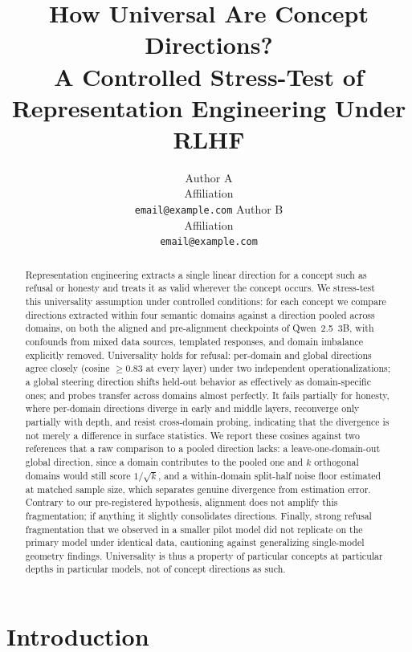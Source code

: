 \documentclass[11pt]{article}
\title{How Universal Are Concept Directions? \\ A Controlled Stress-Test of Representation Engineering Under RLHF}
\author{
  Author A \\
  Affiliation \\
  \texttt{email@example.com}
  \And
  Author B \\
  Affiliation \\
  \texttt{email@example.com}
}
\begin{document}
\maketitle

\begin{abstract}
Representation engineering extracts a single linear direction for a concept
such as refusal or honesty and treats it as valid wherever the concept
occurs. We stress-test this universality assumption under controlled
conditions: for each concept we compare directions extracted within four
semantic domains against a direction pooled across domains, on both the
aligned and pre-alignment checkpoints of Qwen~2.5~3B, with confounds from
mixed data sources, templated responses, and domain imbalance explicitly
removed. Universality holds for refusal: per-domain and global directions
agree closely (cosine $\geq 0.83$ at every layer) under two independent
operationalizations; a global steering direction shifts held-out
behavior as effectively as domain-specific ones; and probes transfer
across domains almost perfectly. It fails partially for honesty, where
per-domain directions diverge in early and middle layers, reconverge only
partially with depth, and resist cross-domain probing, indicating that the
divergence is not merely a difference in surface statistics. We report these
cosines against two references that a raw comparison to a pooled direction
lacks: a leave-one-domain-out global direction, since a domain contributes to
the pooled one and $k$ orthogonal domains would still score $1/\sqrt{k}$, and
a within-domain split-half noise floor estimated at matched sample size, which
separates genuine divergence from estimation error. Contrary to our pre-registered hypothesis, alignment does not
amplify this fragmentation; if anything it slightly consolidates directions.
Finally, strong refusal fragmentation that we observed in a smaller pilot
model did not replicate on the primary model under identical data,
cautioning against generalizing single-model geometry findings. Universality
is thus a property of particular concepts at particular depths in particular
models, not of concept directions as such.
\end{abstract}

\section{Introduction}
\label{sec:intro}
\end{document}
